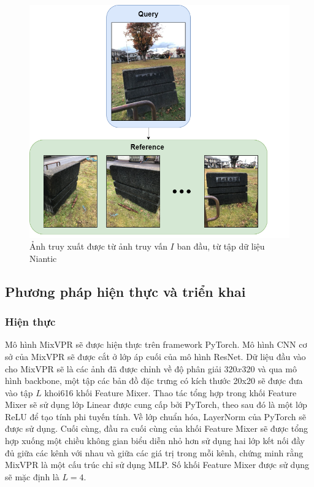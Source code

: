 \begin{figure}[H]
  \centering
  \includegraphics[scale=0.4]{pics/Proposal/query.png}
  \caption[Kết quả của module VPR]{Ảnh truy xuất được từ ảnh truy vấn $I$ ban đầu, từ tập dữ liệu Niantic \cite{arnold2022mapfree}}
\end{figure}


\subsection{Phương pháp hiện thực và triển khai}
\subsubsection{Hiện thực}
Mô hình MixVPR sẽ được hiện thực trên framework PyTorch. Mô hình CNN cơ sở của MixVPR sẽ được cắt ở lớp áp cuối của mô hình ResNet. Dữ liệu đầu vào cho MixVPR sẽ là các ảnh đã được chỉnh về độ phân giải $320x320$ và qua mô hình backbone, một tập các bản đồ đặc trưng có kích thước 20x20 sẽ được đưa vào tập $L$ khoi616 khối Feature Mixer. Thao tác tổng hợp trong khối Feature Mixer sẽ sử dụng lớp Linear được cung cấp bởi PyTorch, theo sau đó là một lớp ReLU để tạo tính phi tuyến tính. Về lớp chuẩn hóa, LayerNorm của PyTorch sẽ được sử dụng. Cuối cùng, đầu ra cuối cùng của khối Feature Mixer sẽ được tổng hợp xuống một chiều không gian biểu diễn nhỏ hơn sử dụng hai lớp kết nối đầy đủ giữa các kênh với nhau và giữa các giá trị trong mỗi kênh, chứng minh rằng MixVPR là một cấu trúc chỉ sử dụng MLP. Số khối Feature Mixer được sử dụng sẽ mặc định là $L=4$.

